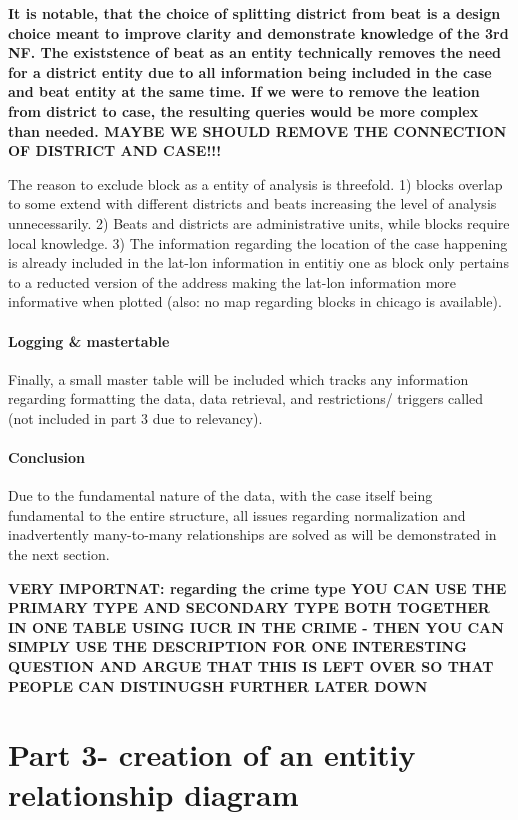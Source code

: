 \documentclass[a4paper]{article}
\begin{document}
\textbf{It is notable, that the choice of splitting district from beat is a design choice meant to improve clarity and demonstrate knowledge of the 3rd NF. The existstence of beat as an entity technically removes the need for a district entity due to all information being included in the case and beat entity at the same time. If we were to remove the leation from district to case, the resulting queries would be more complex than needed.
MAYBE WE SHOULD REMOVE THE CONNECTION OF DISTRICT AND CASE!!!}

The reason to exclude block as a entity of analysis is threefold. 1) blocks overlap to some extend with different districts and beats increasing the level of analysis unnecessarily. 2) Beats and districts are administrative units, while blocks require local knowledge. 3) The information regarding the location of the case happening is already included in the lat-lon information in entitiy one as block only pertains to a reducted version of the address making the lat-lon information more informative when plotted (also: no map regarding blocks in chicago is available). 

\paragraph{Logging \& mastertable } Finally, a small master table will be included which tracks any information regarding formatting the data, data retrieval, and restrictions/ triggers called (not included in part 3 due to relevancy).


\paragraph{Conclusion} Due to the fundamental nature of the data, with the case itself being fundamental to the entire structure, all issues regarding normalization and inadvertently many-to-many relationships are solved as will be demonstrated in the next section.


\textbf{VERY IMPORTNAT: regarding the crime type YOU CAN USE THE PRIMARY TYPE AND SECONDARY TYPE BOTH TOGETHER IN ONE TABLE USING IUCR IN THE CRIME - THEN YOU CAN SIMPLY USE THE DESCRIPTION FOR ONE INTERESTING QUESTION AND ARGUE THAT THIS IS LEFT OVER SO THAT PEOPLE CAN DISTINUGSH FURTHER LATER DOWN}

\section{Part 3- creation of an entitiy relationship diagram}
\end{document}
